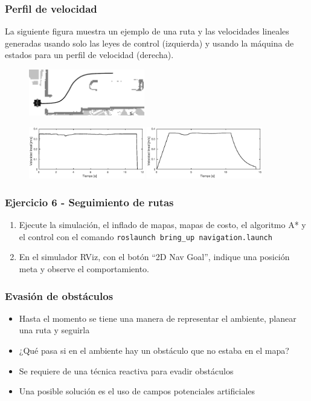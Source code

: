 \begin{frame}\frametitle{Perfil de velocidad}
  La siguiente figura muestra un ejemplo de una ruta y las velocidades lineales generadas usando solo las leyes de control (izquierda) y usando la máquina de estados para un perfil de velocidad (derecha). 
  \begin{figure}
    \centering
    \includegraphics[width=0.45\textwidth]{Figures/SpeedProfilePath.png}
  \end{figure}
  \begin{figure}
    \centering
    \includegraphics[width=0.45\textwidth]{Figures/SpeedWithoutProfile.eps}
    \includegraphics[width=0.45\textwidth]{Figures/SpeedWithProfile.eps}
  \end{figure}
\end{frame}

\begin{frame}[containsverbatim]\frametitle{Ejercicio 6 - Seguimiento de rutas}
  \begin{enumerate}
  \item Ejecute la simulación, el inflado de mapas, mapas de costo, el algoritmo A* y el control con el comando \texttt{roslaunch bring\_up navigation.launch}
  \item En el simulador RViz, con el botón ``2D Nav Goal'', indique una posición meta y observe el comportamiento. 
  \end{enumerate}
\end{frame}

\begin{frame}\frametitle{Evasión de obstáculos}
  \begin{itemize}
  \item Hasta el momento se tiene una manera de representar el ambiente, planear una ruta y seguirla
  \item ¿Qué pasa si en el ambiente hay un obstáculo que no estaba en el mapa?
  \item Se requiere de una técnica reactiva para evadir obstáculos
  \item Una posible solución es el uso de campos potenciales artificiales
  \end{itemize}
\end{frame}

